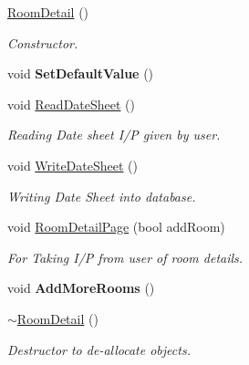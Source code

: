 \begin{DoxyCompactItemize}
\item 
\hypertarget{classRoomDetail_acbbb21580bc1591daf23e614011acc06}{\hyperlink{classRoomDetail_acbbb21580bc1591daf23e614011acc06}{Room\-Detail} ()}\label{classRoomDetail_acbbb21580bc1591daf23e614011acc06}

\begin{DoxyCompactList}\small\item\em Constructor. \end{DoxyCompactList}\item 
\hypertarget{classRoomDetail_a117bed37b0f95b364b7133fe13afa9b7}{void {\bfseries Set\-Default\-Value} ()}\label{classRoomDetail_a117bed37b0f95b364b7133fe13afa9b7}

\item 
\hypertarget{classRoomDetail_ab8a07fd05ab314e85b374191e38e8556}{void \hyperlink{classRoomDetail_ab8a07fd05ab314e85b374191e38e8556}{Read\-Date\-Sheet} ()}\label{classRoomDetail_ab8a07fd05ab314e85b374191e38e8556}

\begin{DoxyCompactList}\small\item\em Reading Date sheet I/\-P given by user. \end{DoxyCompactList}\item 
\hypertarget{classRoomDetail_a90d4fc5bf3497068efecb5c9ec13e887}{void \hyperlink{classRoomDetail_a90d4fc5bf3497068efecb5c9ec13e887}{Write\-Date\-Sheet} ()}\label{classRoomDetail_a90d4fc5bf3497068efecb5c9ec13e887}

\begin{DoxyCompactList}\small\item\em Writing Date Sheet into database. \end{DoxyCompactList}\item 
\hypertarget{classRoomDetail_ab2c0a691ce4dea82d16f991c66021931}{void \hyperlink{classRoomDetail_ab2c0a691ce4dea82d16f991c66021931}{Room\-Detail\-Page} (bool add\-Room)}\label{classRoomDetail_ab2c0a691ce4dea82d16f991c66021931}

\begin{DoxyCompactList}\small\item\em For Taking I/\-P from user of room details. \end{DoxyCompactList}\item 
\hypertarget{classRoomDetail_ac4d4701717acda86a95c68ef5abbab28}{void {\bfseries Add\-More\-Rooms} ()}\label{classRoomDetail_ac4d4701717acda86a95c68ef5abbab28}

\item 
\hypertarget{classRoomDetail_ae65b9b167e75a7dc994c4e2021937c68}{\hyperlink{classRoomDetail_ae65b9b167e75a7dc994c4e2021937c68}{$\sim$\-Room\-Detail} ()}\label{classRoomDetail_ae65b9b167e75a7dc994c4e2021937c68}

\begin{DoxyCompactList}\small\item\em Destructor to de-\/allocate objects. \end{DoxyCompactList}\end{DoxyCompactItemize}
